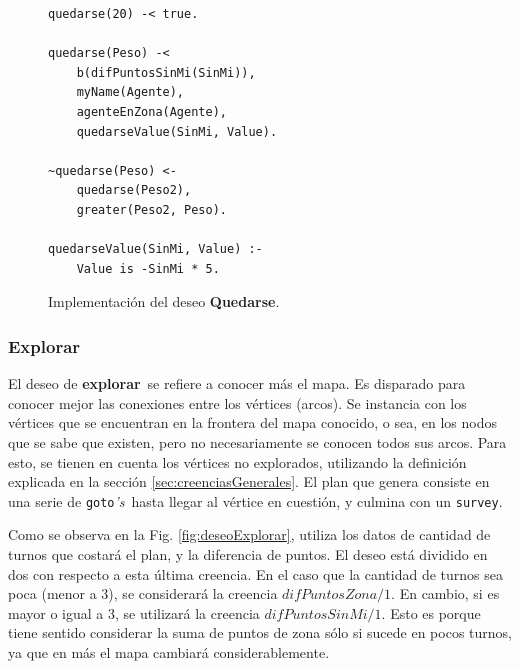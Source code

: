 \documentclass[oneside]{book}
\theoremstyle{definition}
\theoremstyle{example}
\newcommand{\lit}[1]{\mbox{$ #1$}}
\begin{document}
\begin{figure}
\begin{verbatim}
quedarse(20) -< true.

quedarse(Peso) -< 
    b(difPuntosSinMi(SinMi)),
    myName(Agente),
    agenteEnZona(Agente),
    quedarseValue(SinMi, Value).

~quedarse(Peso) <-
    quedarse(Peso2),
    greater(Peso2, Peso).

quedarseValue(SinMi, Value) :-   
    Value is -SinMi * 5.
\end{verbatim}
\caption{Implementación del deseo \textbf{Quedarse}.}
\label{fig:deseoQuedarse}
\end{figure}


\subsubsection{Explorar}

El deseo de \textbf{explorar}\ se refiere a conocer más el mapa. Es disparado para 
conocer mejor las conexiones entre los vértices (arcos). Se instancia con los vértices
que se encuentran en la frontera del mapa conocido, o sea, en los nodos que se sabe
que existen, pero no necesariamente se conocen todos sus arcos. Para esto, se tienen en 
cuenta los vértices no explorados, utilizando la definición explicada en la 
sección \ref{sec:creenciasGenerales}. El plan que genera 
consiste en una serie de \texttt{goto}\textit{'s}\ hasta llegar al vértice en cuestión, y 
culmina con un \texttt{survey}.



Como se observa en la Fig. \ref{fig:deseoExplorar}, utiliza los datos de cantidad de 
turnos que costará el plan, y la diferencia de puntos.
El deseo está dividido en dos con respecto a esta última creencia. En el caso que la
cantidad de turnos sea poca (menor a 3), se considerará la creencia 
\lit{difPuntosZona/1}. En cambio, si es mayor o igual a 3, se utilizará la creencia
\lit{difPuntosSinMi/1}. Esto es porque tiene sentido considerar la suma de puntos
de zona sólo si sucede en pocos turnos, ya que en más el mapa cambiará 
considerablemente. 
\end{document}
